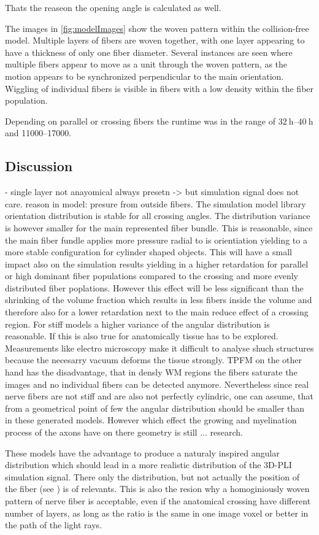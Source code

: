 Thats the reaseon the opening angle is calculated as well.
\par
% 
The images in \cref{fig:modelImages} show the woven pattern within the collision-free model.
Multiple layers of fibers are woven together, with one layer appearing to have a thickness of only one fiber diameter.
Several instances are seen where multiple fibers appear to move as a unit through the woven pattern,\eg{} as the motion appears to be synchronized perpendicular to the main orientation.
Wiggling of individual fibers is visible in fibers with a low density within the fiber population.
\par
% 
Depending on parallel or crossing fibers the runtime was in the range of $\SIrange{32}{40}{\hour}$ and \SIrange{11000}{17000}{\steps}.
% 
\subsection{Discussion}
%
% 
- single layer not anayomical always presetn -> but simulation signal does not care. reason in model: presure from outside fibers.
% 
The simulation model library orientation distribution is stable for all crossing angles.
The distribution variance is however smaller for the main represented fiber bundle.
This is reasonable, since the main fiber fundle applies more pressure radial to is orientiation yielding to a more stable configuration for cylinder shaped objects.
This will have a small impact also on the simulation results yielding in a higher retardation for parallel or high dominant fiber populations compared to the crossing and more evenly distributed fiber poplations.
However this effect will be less significant than the shrinking of the volume fraction which results in less fibers inside the volume and therefore also for a lower retardation next to the main reduce effect of a crossing region.
For stiff models a higher variance of the angular distribution is reasonable. 
If this is also true for anatomically tissue has to be explored.
Measurements like electro microscopy make it difficult to analyse shuch structures because the necesarry vacuum deforms the tissue strongly.
TPFM on the other hand has the disadvantage, that in densly \ac{WM} regions the fibers saturate the images and no individual fibers can be detected anymore.
Nevertheless since real nerve fibers are not stiff and are also not perfectly cylindric, one can assume, that from a geometrical point of few the angular distribution should be smaller than in these generated models.
However which effect the growing and myelination process of the axons have on there geometry is still ... research.

These models have the advantage to produce a naturaly inspired angular distribution which should lead in a more realistic distribution of the \ac{3D-PLI} simulation signal.
There only the distribution, but not actually the position of the fiber (see \dummy{}) is of relevants.
This is also the resion why a homoginiously woven pattern of nerve fiber is acceptable, even if the anatomical crossing have different number of layers, as long as the ratio is the same in one image voxel or better in the path of the light rays.